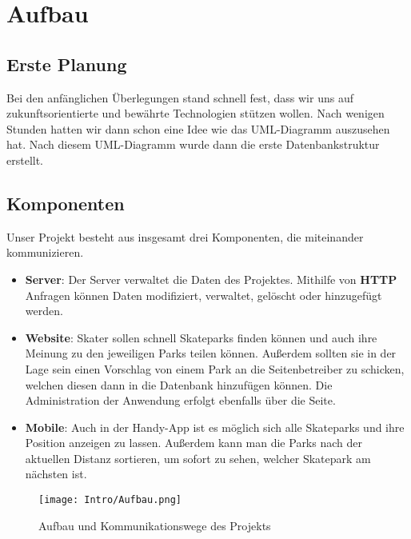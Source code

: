 \chapter{Aufbau}

\section{Erste Planung}
Bei den anfänglichen Überlegungen stand schnell fest, dass wir uns auf zukunftsorientierte und bewährte Technologien
stützen wollen. Nach wenigen Stunden hatten wir dann schon eine Idee wie das
UML-Diagramm auszusehen hat. Nach diesem UML-Diagramm wurde dann die erste Datenbankstruktur erstellt.

\section{Komponenten}
Unser Projekt besteht aus insgesamt drei Komponenten, die miteinander kommunizieren.

\begin{itemize}
  \item \textbf{Server}: Der Server verwaltet die Daten des Projektes. Mithilfe von \textbf{HTTP}
        Anfragen können Daten modifiziert, verwaltet, gelöscht oder hinzugefügt werden.

  \item \textbf{Website}: Skater sollen schnell Skateparks finden können und auch ihre Meinung zu den
        jeweiligen Parks teilen können. Außerdem sollten sie in der Lage sein einen Vorschlag von einem
        Park an die Seitenbetreiber zu schicken, welchen diesen dann in die Datenbank hinzufügen können.
        Die Administration der Anwendung erfolgt ebenfalls über die Seite.

  \item \textbf{Mobile}: Auch in der Handy-App ist es möglich sich alle Skateparks und ihre
        Position anzeigen zu lassen. Außerdem kann man die Parks nach der aktuellen Distanz sortieren,
        um sofort zu sehen, welcher Skatepark am nächsten ist.
\end{itemize}

\begin{figure}[H]
  \begin{center}
    \texttt{[image: Intro/Aufbau.png]}
    \caption{Aufbau und Kommunikationswege des Projekts}
  \end{center}
\end{figure}

